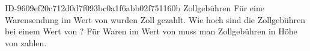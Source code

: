 \begin{exercise}
      {ID-9609ef20c712d0d7f093bc0a1f6abb02f751160b}
      {Zollgebühren}
  \ifproblem\problem
    Für eine Warensendung im Wert von  wurden  Zoll gezahlt.
    Wie hoch sind die Zollgebühren bei einem Wert von ?
  \fi
  \ifoutcome\outcome
    Für Waren im Wert von  muss man Zollgebühren in Höhe von  zahlen.
  \fi
\end{exercise}
